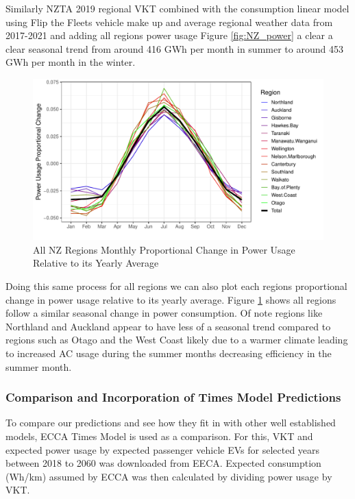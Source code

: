 \documentclass[
]{article}
\begin{document}
Similarly NZTA 2019 regional VKT combined with the consumption linear
model using Flip the Fleets vehicle make up and average regional weather
data from 2017-2021 and adding all regions power usage Figure
\ref{fig:NZ_power} a clear a clear seasonal trend from around 416 GWh
per month in summer to around 453 GWh per month in the winter.

\begin{figure}
\centering
\includegraphics{final_report_files/figure-latex/NZ_region_power_prop-1.pdf}
\caption{All NZ Regions Monthly Proportional Change in Power Usage
Relative to its Yearly Average\label{fig:NZ_region_power_prop}}
\end{figure}

Doing this same process for all regions we can also plot each regions
proportional change in power usage relative to its yearly average.
Figure \ref{fig:NZ_region_power_prop} shows all regions follow a similar
seasonal change in power consumption. Of note regions like Northland and
Auckland appear to have less of a seasonal trend compared to regions
such as Otago and the West Coast likely due to a warmer climate leading
to increased AC usage during the summer months decreasing efficiency in
the summer month.

\hypertarget{comparison-and-incorporation-of-times-model-predictions}{%
\subsubsection{Comparison and Incorporation of Times Model
Predictions}\label{comparison-and-incorporation-of-times-model-predictions}}

To compare our predictions and see how they fit in with other well
established models, ECCA Times Model \cite{times_model} is used as a
comparison. For this, VKT and expected power usage by expected passenger
vehicle EVs for selected years between 2018 to 2060 was downloaded from
EECA. Expected consumption (Wh/km) assumed by ECCA was then calculated
by dividing power usage by VKT.
\end{document}
